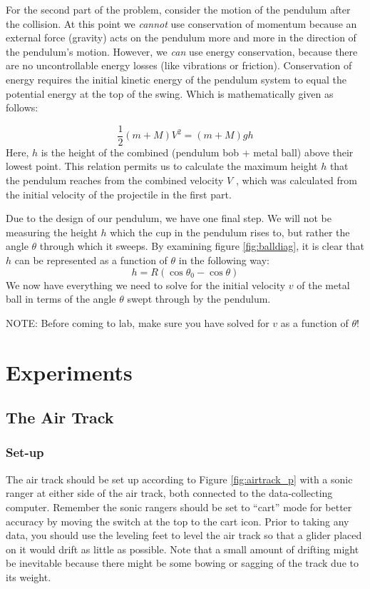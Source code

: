 For the second part of the problem, consider the motion of the pendulum after the collision. At this point we {\it{cannot}} use conservation of momentum because an external force (gravity) acts on the pendulum more and more in the direction of the pendulum's motion.  However, we {\it{can}} use energy conservation, because there are no uncontrollable energy losses (like vibrations or friction). Conservation of energy requires the initial kinetic energy of the pendulum system to equal the potential energy at the top of the swing. Which is mathematically given as follows:

\begin{equation}
    \frac{1}{2}(m+M)V^2 = (m+M)gh
\end{equation}
Here, $h$ is the height of the combined (pendulum bob + metal ball) above their lowest point.  This relation permits us to calculate the maximum height $h$ that the pendulum reaches from the combined velocity $V$ , which was calculated from the initial velocity of the projectile in the first part.\myskip

Due to the design of our pendulum, we have one final step.  We will not be measuring the height $h$ which the cup in the pendulum rises to, but rather the angle $\theta$ through which it sweeps.  By examining figure \ref{fig:balldiag}, it is clear that $h$ can be represented as a function of $\theta$ in the following way:
\begin{equation}
    h = R(\cos\theta_0-\cos\theta)
\end{equation}
We now have everything we need to solve for the initial velocity $v$ of the metal ball in terms of the angle $\theta$ swept through by the pendulum.\myskip

NOTE: Before coming to lab, make sure you have solved for $v$ as a function of $\theta$!

\section{Experiments}
\subsection{The Air Track}

\subsubsection{Set-up}

The air track should be set up according to Figure \ref{fig:airtrack_p} with a sonic ranger at either side of the air track, both connected to the data-collecting computer. Remember the sonic rangers should be set to ``cart'' mode for better accuracy by moving the switch at the top to the cart icon. Prior to taking any data, you should use the leveling feet to level the air track so that a glider placed on it would drift as little as possible. Note that a small amount of drifting might be inevitable because there might be some bowing or sagging of the track due to its weight.\myskip

